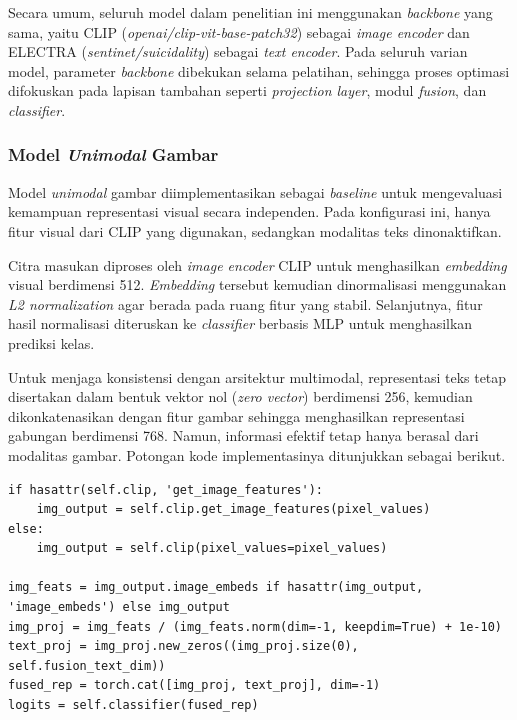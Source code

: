 Secara umum, seluruh model dalam penelitian ini menggunakan \textit{backbone} yang sama, yaitu CLIP (\textit{openai/clip-vit-base-patch32}) sebagai \textit{image encoder} dan ELECTRA (\textit{sentinet/suicidality}) sebagai \textit{text encoder}. Pada seluruh varian model, parameter \textit{backbone} dibekukan selama pelatihan, sehingga proses optimasi difokuskan pada lapisan tambahan seperti \textit{projection layer}, modul \textit{fusion}, dan \textit{classifier}.

\subsubsection{Model \textit{Unimodal} Gambar}
\label{IV.Model.Konfigurasi.UnimodalGambar}

Model \textit{unimodal} gambar diimplementasikan sebagai \textit{baseline} untuk mengevaluasi kemampuan representasi visual secara independen. Pada konfigurasi ini, hanya fitur visual dari CLIP yang digunakan, sedangkan modalitas teks dinonaktifkan.

Citra masukan diproses oleh \textit{image encoder} CLIP untuk menghasilkan \textit{embedding} visual berdimensi 512. \textit{Embedding} tersebut kemudian dinormalisasi menggunakan \textit{L2 normalization} agar berada pada ruang fitur yang stabil. Selanjutnya, fitur hasil normalisasi diteruskan ke \textit{classifier} berbasis MLP untuk menghasilkan prediksi kelas.

Untuk menjaga konsistensi dengan arsitektur multimodal, representasi teks tetap disertakan dalam bentuk vektor nol (\textit{zero vector}) berdimensi 256, kemudian dikonkatenasikan dengan fitur gambar sehingga menghasilkan representasi gabungan berdimensi 768. Namun, informasi efektif tetap hanya berasal dari modalitas gambar. Potongan kode implementasinya ditunjukkan sebagai berikut.

\begin{lstlisting}[caption={Kode implementasi model \textit{unimodal} gambar}, label={code:4.unimodal_gambar}]
if hasattr(self.clip, 'get_image_features'):
    img_output = self.clip.get_image_features(pixel_values)
else:
    img_output = self.clip(pixel_values=pixel_values)

img_feats = img_output.image_embeds if hasattr(img_output, 'image_embeds') else img_output
img_proj = img_feats / (img_feats.norm(dim=-1, keepdim=True) + 1e-10)
text_proj = img_proj.new_zeros((img_proj.size(0), self.fusion_text_dim))
fused_rep = torch.cat([img_proj, text_proj], dim=-1)
logits = self.classifier(fused_rep)
\end{lstlisting}

